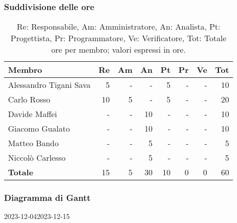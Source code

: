 \subsubsection{Suddivisione delle ore}

\begin{table}[H]
	\centering
	\begin{tabular}{l|r|r|r|r|r|r|r}
		\textbf{Membro}        & \textbf{Re} & \textbf{Am} & \textbf{An} & \textbf{Pt} & \textbf{Pr} & \textbf{Ve} & \textbf{Tot} \\
		\hline
		Alessandro Tigani Sava & 5           & -           & -           & 5           & -           & -           & 10           \\
		Carlo Rosso            & 10          & 5           & -           & 5           & -           & -           & 20           \\
		Davide Maffei          & -           & -           & 10          & -           & -           & -           & 10           \\
		Giacomo Gualato        & -           & -           & 10          & -           & -           & -           & 10           \\
		Matteo Bando           & -           & -           & 5           & -           & -           & -           & 5            \\
		Niccolò Carlesso       & -           & -           & 5           & -           & -           & -           & 5            \\
		\hline
		\textbf{Totale}        & 15          & 5           & 30          & 10          & 0           & 0           & 60           \\
	\end{tabular}

	\caption{Re: Responsabile, Am: Amministratore, An: Analista, Pt:
		Progettista, Pr: Programmatore, Ve: Verificatore, Tot: Totale ore per
		membro; valori espressi in ore.}
\end{table}

\subsubsection{Diagramma di Gantt}

\begin{ganttchart}[
		x unit=0.6cm, %
		y unit chart=0.6cm,
		bar/.style={fill=blue!50},
		bar height=0.5,
		time slot format=isodate,
		time slot unit=day,
		vgrid,
		today=2023-12-04,
		today rule/.style={draw=red, ultra thick}
	]{2023-12-04}{2023-12-15}
	 \\
	 \\
	 \\
	 \\
	 \\
\end{ganttchart}


